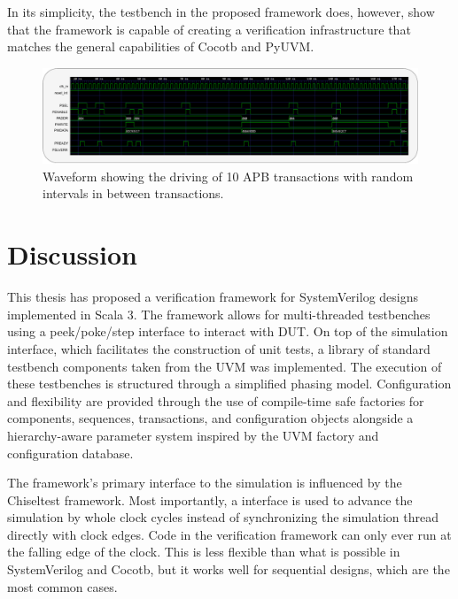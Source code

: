 In its simplicity, the testbench in the proposed framework does, however, show that the framework is capable of creating a verification infrastructure that matches the general capabilities of Cocotb and PyUVM.

\begin{figure}[t]
  \centering
  \includegraphics[width=\textwidth]{diagrams/apb_timing.pdf}
  \caption{Waveform showing the driving of 10 APB transactions with random intervals in between transactions.}
  \label{fig:apb_timing}
\end{figure}


\chapter{Discussion} %


This thesis has proposed a verification framework for SystemVerilog designs implemented in Scala 3. The framework allows for multi-threaded testbenches using a peek/poke/step interface to interact with DUT. On top of the simulation interface, which facilitates the construction of unit tests, a library of standard testbench components taken from the UVM was implemented. The execution of these testbenches is structured through a simplified phasing model. Configuration and flexibility are provided through the use of compile-time safe factories for components, sequences, transactions, and configuration objects alongside a hierarchy-aware parameter system inspired by the UVM factory and configuration database.

The framework's primary interface to the simulation is influenced by the Chiseltest framework. Most importantly, a  interface is used to advance the simulation by whole clock cycles instead of synchronizing the simulation thread directly with clock edges. Code in the verification framework can only ever run at the falling edge of the clock. This is less flexible than what is possible in SystemVerilog and Cocotb, but it works well for sequential designs, which are the most common cases. 

